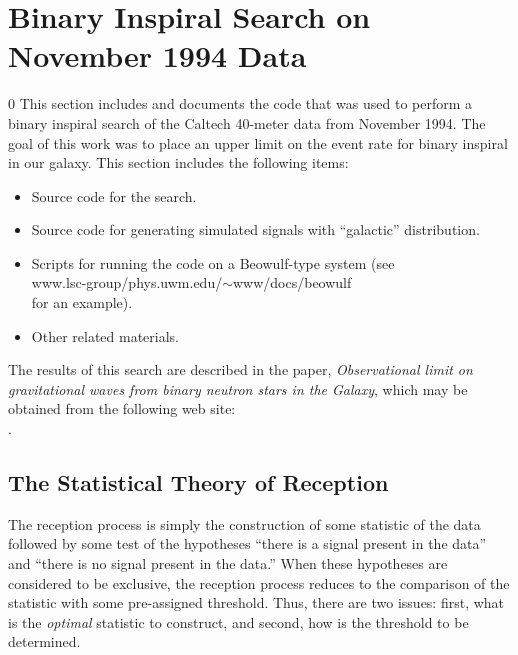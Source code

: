 \section{Binary Inspiral Search on November 1994 Data}
\label{s:binary-search}
\setcounter{equation}0
This section includes and documents the code that was used to perform
a binary inspiral search of the Caltech 40-meter data from November
1994.
The goal of this work was to place an upper limit on the event
rate for binary inspiral in our galaxy.  This section includes the
following items:
\begin{itemize}
\item
Source code for the search.
\item
Source code for generating simulated signals with ``galactic''
distribution.
\item
Scripts for running the code on a Beowulf-type system (see\\
{www.lsc-group/phys.uwm.edu/$\sim$www/docs/beowulf}\\
for an example).
\item
Other related materials.
\end{itemize}
The results of this search are described in the paper,
{\it Observational limit on gravitational waves from binary neutron stars in the
Galaxy}\cite{40msearch}, which may be obtained from the following web site:\\
.
\clearpage

\subsection{The Statistical Theory of Reception}
\label{ss:reception}

The reception process is simply the construction of some
statistic of the data followed by some test of the hypotheses ``there is
a signal present in the data'' and ``there is no signal present in the data.''
When these hypotheses are considered to be exclusive, the reception process
reduces to the comparison of the statistic with some pre-assigned threshold.
Thus, there are two issues: first, what is the \emph{optimal} statistic to
construct, and second, how is the threshold to be determined.

